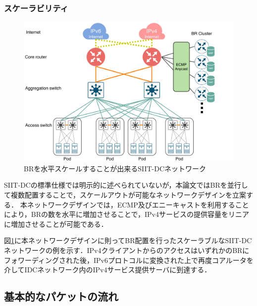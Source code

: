\subsubsection{スケーラビリティ}
\label{issue:siit-dc-merit:scalability}
\begin{figure}[h]
  \begin{center}
    \includegraphics[width=12cm,pagebox=cropbox,clip]{img/siit-dc_scale.pdf}
  \end{center}
  \caption{BRを水平スケールすることが出来るSIIT-DCネットワーク}
  \label{fig:siit-dc_network_scale}
\end{figure}
SIIT-DCの標準仕様\cite{RFC7755}では明示的に述べられていないが，本論文ではBRを並行して複数配置することで，スケールアウトが可能なネットワークデザインを立案する．
本ネットワークデザインでは，ECMP及びエニーキャスト\cite{RFC4786}を利用することにより，BRの数を水平に増加させることで，IPv4サービスの提供容量をリニアに増加させることが可能である．

図\ref{fig:siit-dc_network_scale}に本ネットワークデザインに則ってBR配置を行ったスケーラブルなSIIT-DCネットワークの例を示す．IPv4クライアントからのアクセスはいずれかのBRにフォワーディングされた後，IPv6プロトコルに変換された上で再度コアルータを介してIDCネットワーク内のIPv4サービス提供サーバに到達する．



\subsection{基本的なパケットの流れ}
\label{issue:siit-dc:packet_flow}

